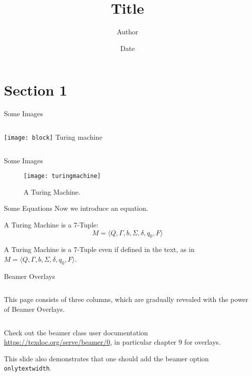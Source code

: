 \documentclass[%
    aspectratio=169, %
    onlytextwidth,   %
]{beamer}
\title              {Title}
\author             {Author}
\institute          {Institute, University of Basel}
\date               {Date}
\begin{document}
\begin{frame}[t,plain]
\titlepage
\end{frame}


\section{Section 1}	%

\begin{frame}[label=turing,c]{Some Images}
\begin{columns}[c]
            \texttt{[image: block]}
            Turing machine \cite{turing:1936,turing:1950}
\end{columns}
\end{frame}


\begin{frame}[c]{Some Images}
    \begin{figure}
        \texttt{[image: turingmachine]}
        \caption{A Turing Machine.}
    \end{figure}
\end{frame}


\begin{frame}[c]{Some Equations}
Now we introduce an equation.
\begin{theorem}
A Turing Machine is a 7-Tuple:
\begin{equation}
    M = \langle Q, \Gamma, b, \Sigma, \delta, q_0, F \rangle
\end{equation}
\end{theorem}
A Turing Machine is a 7-Tuple even if defined in the text, as in $M = \langle Q, \Gamma, b, \Sigma, \delta, q_0, F \rangle$.
\end{frame}

\begin{frame}[c]{Beamer Overlays}
    \begin{columns}
            This page consists of three columns,
            which are gradually revealed
            with the power of Beamer Overlays.
    \end{columns}
    \bigskip{}

    Check out the beamer class user documentation \url{https://texdoc.org/serve/beamer/0}, in particular chapter 9 for overlays.
    \bigskip{}
    
    This slide also demonstrates that one should add the beamer option \texttt{onlytextwidth}.
\end{frame}
\end{document}
